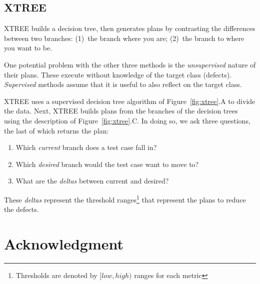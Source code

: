 \documentclass[conference]{IEEEtran}
\newcommand{\be}{\begin{enumerate}}
\newcommand{\ee}{\end{enumerate}}
\newcommand{\fig}[1]{Figure~\ref{fig:#1}}
\begin{document}
\subsection{XTREE}
XTREE builds a decision tree,  then generates
plans by contrasting the differences between two branches:
(1)~the branch where you are; (2)~the branch to where you want to be.

One potential problem with the other three methods is the {\em unsupervised} nature of
their plans. These  
execute without knowledge of the target class (defects).  {\em Supervised} methods assume that it is useful to also reflect on the target class.

XTREE uses a supervised decision tree algorithm of \fig{xtree}.A to divide the data.
Next, XTREE builds plans from the branches of the decision trees using the description of \fig{xtree}.C.
In doing so, we ask three questions, the last of which returns the plan:
\be
\item
Which {\em current} branch does a test case fall in?
\item Which {\em desired} branch would the test case want to move to?
\item What are the {\em deltas} between current and desired? 
\ee
These \textit{deltas} represent the threshold ranges\footnote{Thresholds are denoted by $[low,high)$ ranges for each metric} that represent the plans to reduce the defects. 


\section*{Acknowledgment}



\end{document}
